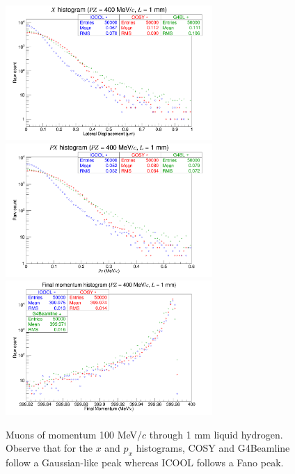 \begin{figure}[H]
  \centering
    \includegraphics[width=0.7\textwidth]{Benchmarking/LH/X.400.1.png} 
    \includegraphics[width=0.7\textwidth]{Benchmarking/LH/PX.400.1.png} 
    \includegraphics[width=0.7\textwidth]{Benchmarking/LH/strag.400.1.png} 
  \caption[Muons of momentum 400 MeV/$c$ through 1 mm liquid hydrogen.]{Muons of momentum 100 MeV/$c$ through 1 mm liquid hydrogen. Observe that for the $x$ and $p_x$ histograms, COSY and G4Beamline follow a Gaussian-like peak whereas ICOOL follows a Fano peak.}
  \label{fig:400.1}
\end{figure}

